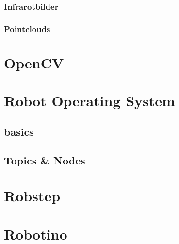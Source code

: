			
			\subsubsection{Infrarotbilder}
			\subsubsection{Pointclouds}
	\section{OpenCV}
	\section{Robot Operating System}
		\subsection{basics}
		\subsection{Topics \& Nodes}
	\section{Robstep}
	\section{Robotino}
